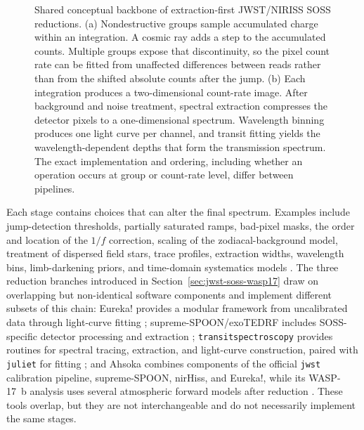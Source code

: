 \begin{figure}[t]
  \centering
  
  \caption{Shared conceptual backbone of extraction-first JWST/NIRISS SOSS
  reductions. (a) Nondestructive groups sample accumulated charge within an
  integration. A cosmic ray adds a step to the accumulated counts. Multiple
  groups expose that discontinuity, so the pixel count rate can be fitted from
  unaffected differences between reads rather than from the shifted absolute
  counts after the jump.
  (b) Each integration produces a two-dimensional count-rate image. After
  background and noise treatment, spectral extraction compresses the detector
  pixels to a one-dimensional spectrum. Wavelength binning produces one light
  curve per channel, and transit fitting yields the wavelength-dependent depths
  that form the transmission spectrum. The exact implementation and ordering,
  including whether an operation occurs at group or count-rate level, differ
  between pipelines.}
  \label{fig:extraction-first-workflow}
\end{figure}


Each stage contains choices that can alter the final spectrum. Examples include
jump-detection thresholds, partially saturated ramps, bad-pixel masks, the
order and location of the $1/f$ correction, scaling of the zodiacal-background
model, treatment of dispersed field stars, trace profiles, extraction widths,
wavelength bins, limb-darkening priors, and time-domain systematics models
\citep{RadicaEtAl2023,HolmbergMadhusudhan2023,LouieEtAl2025}. The three
reduction branches introduced in Section~\ref{sec:jwst-soss-wasp17} draw on
overlapping but non-identical software components and implement different
subsets of this chain: Eureka! provides a modular framework from uncalibrated
data through light-curve fitting \citep{BellEtAl2022}; supreme-SPOON/exoTEDRF
includes SOSS-specific detector processing and extraction
\citep{RadicaEtAl2023,Radica2024}; \texttt{transitspectroscopy} provides
routines for spectral tracing, extraction, and light-curve construction,
paired with \texttt{juliet} for fitting
\citep{Espinoza2022TransitSpectroscopy,EspinozaEtAl2019}; and Ahsoka combines
components of the official \texttt{jwst} calibration pipeline, supreme-SPOON,
nirHiss, and Eureka!, while its WASP-17~b analysis uses several atmospheric
forward models after reduction \citep{LouieEtAl2025}. These tools overlap, but
they are not interchangeable and do not necessarily implement the same stages.

